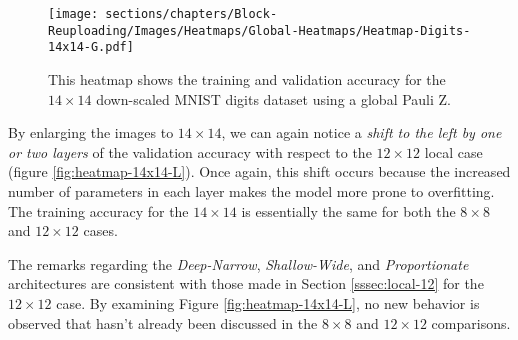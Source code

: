 \begin{figure}[h]
    \centering
    \texttt{[image: sections/chapters/Block-Reuploading/Images/Heatmaps/Global-Heatmaps/Heatmap-Digits-14x14-G.pdf]}
    \caption{This heatmap shows the training and validation accuracy for the $14\times14$ 
    down-scaled MNIST digits dataset using a global Pauli Z.}
    \label{fig:heatmap-14x14-G}
\end{figure}


By enlarging the images to $14\times14$, we can again notice a \textit{shift to the left by 
one or two layers} of the validation accuracy with respect to the $12\times12$ local case (figure 
\ref{fig:heatmap-14x14-L}). Once again, this shift 
occurs because the increased number of parameters in each layer makes the model more prone to overfitting.
The training accuracy for the $14\times14$ is essentially the same for both the $8\times8$ and 
$12\times12$ cases.

The remarks regarding the \textit{Deep-Narrow}, \textit{Shallow-Wide}, and \textit{Proportionate} 
architectures are consistent with those made in Section \ref{sssec:local-12} for the $12\times12$ case.
By examining Figure \ref{fig:heatmap-14x14-L}, no new behavior is observed that hasn't already 
been discussed in the $8\times8$ and $12\times12$ comparisons.
